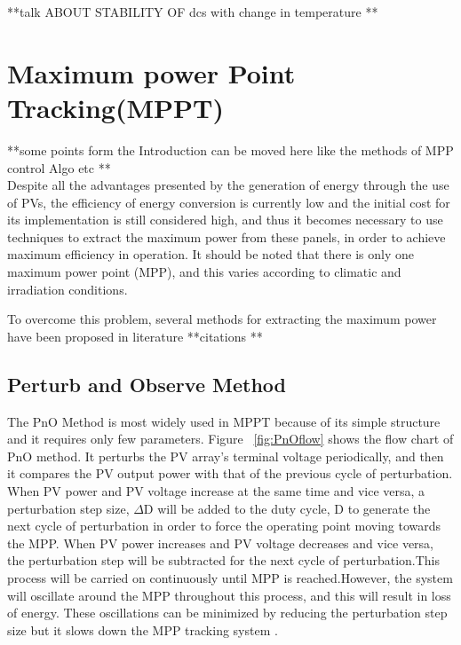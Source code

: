 {**talk ABOUT STABILITY OF dcs with change in temperature **

\section{Maximum power Point Tracking(MPPT)}

**some points form the Introduction can be moved here like the methods of MPP control Algo etc ** \\

Despite all the advantages presented by the generation of energy through the use of PVs, the efficiency of energy conversion is currently low and the initial cost for its implementation is still considered high, and thus it becomes necessary to use techniques to extract the maximum power from these panels, in order to achieve maximum efficiency in operation. It should be noted that there is only one maximum power point (MPP), and this varies according to climatic and irradiation conditions\cite{eltawil2013mppt}.

To overcome this problem, several methods for extracting the maximum power have been proposed in literature **citations **

\subsection{Perturb and Observe Method }
  The \ac{PnO} Method is most widely used in \ac{MPPT} because of  its simple structure and it requires only few parameters. Figure ~\ref{fig:PnOflow}  shows the flow chart of \ac{PnO} method. It perturbs the PV array's terminal voltage periodically, and then it compares the PV output power with that of the previous cycle of perturbation. When PV power and PV voltage increase at the same time and vice versa, a perturbation step size, ${\Delta}$D will be added to the duty cycle, D to generate the next cycle of   perturbation in order to force the operating point moving towards the \ac{MPP}. When PV power increases and PV voltage decreases and vice versa, the perturbation step will be subtracted for the next cycle of perturbation.This process will be carried on continuously until \ac{MPP} is reached.However, the system will oscillate around the \ac{MPP} throughout this process, and this will result in loss of energy. These oscillations can be minimized by reducing the perturbation step size but it slows down the \ac{MPP} tracking system \cite{ngan2011study}.  \\
  
}
